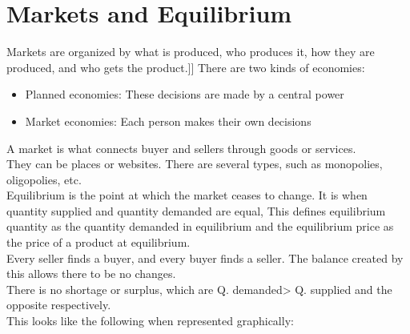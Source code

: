 \documentclass[nobib]{tufte-handout}
\begin{document}
\section{Markets and Equilibrium}
Markets are organized by what is produced, who produces it, how they are
produced, and who gets the product.]] There are two kinds of economies:
\begin{itemize}
    \item Planned economies: These decisions are made by a central power
    \item Market economies: Each person makes their own decisions
\end{itemize}
A market is what connects buyer and sellers through goods or services.\\
They can be places or websites. There are several types, such as monopolies, oligopolies, etc.\\
Equilibrium is the point at which the market ceases to change. It is when quantity supplied and quantity demanded are equal,
This defines equilibrium quantity as the quantity demanded in equilibrium and the equilibrium price as the price of a product at equilibrium.\\
Every seller finds a buyer, and every buyer finds a seller. The balance created by this allows there to be no changes.\\
There is no shortage or surplus, which are Q. demanded> Q. supplied and the opposite respectively.\\
This looks like the following when represented graphically:
\begin{center}
\end{center}
\end{document}
